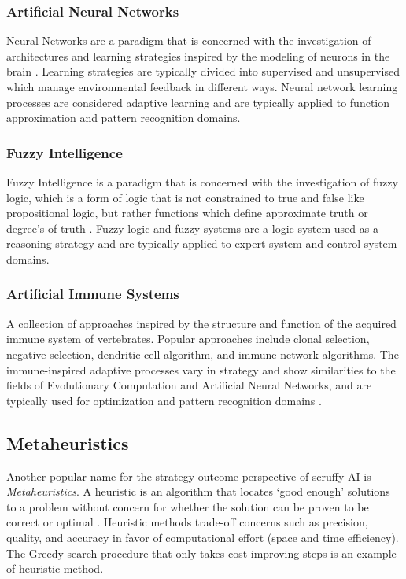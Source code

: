 \begin{bibunit}
\subsubsection{Artificial Neural Networks}
Neural Networks are a paradigm that is concerned with the investigation of architectures and learning strategies inspired by the modeling of neurons in the brain \cite{Bishop1995}. Learning strategies are typically divided into supervised and unsupervised which manage environmental feedback in different ways. Neural network learning processes are considered adaptive learning and are typically applied to function approximation and pattern recognition domains.

\subsubsection{Fuzzy Intelligence}
Fuzzy Intelligence is a paradigm that is concerned with the investigation of fuzzy logic, which is a form of logic that is not constrained to true and false like propositional logic, but rather functions which define approximate truth or degree’s of truth \cite{Zadeh1996}. Fuzzy logic and fuzzy systems are a logic system used as a reasoning strategy and are typically applied to expert system and control system domains.

\subsubsection{Artificial Immune Systems}
A collection of approaches inspired by the structure and function of the acquired immune system of vertebrates. Popular approaches include clonal selection, negative selection, dendritic cell algorithm, and immune network algorithms. The immune-inspired adaptive processes vary in strategy and show similarities to the fields of Evolutionary Computation and Artificial Neural Networks, and are typically used for optimization and pattern recognition domains \cite{Castro2002}.  

% 
% 
\subsection{Metaheuristics}
\label{sec:metaheuristics}
Another popular name for the strategy-outcome perspective of scruffy AI is \emph{Metaheuristics}. 
A heuristic is an algorithm that locates `good enough' solutions to a problem without concern for whether the solution can be proven to be correct or optimal \cite{Michalewicz2004}. Heuristic methods trade-off concerns such as precision, quality, and accuracy in favor of computational effort (space and time efficiency). The Greedy search procedure that only takes cost-improving steps is an example of heuristic method.


\end{bibunit}
